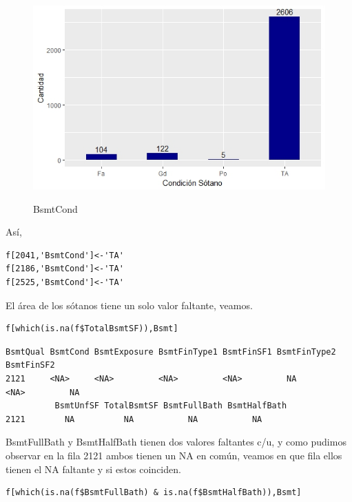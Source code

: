 \documentclass{report}
\begin{document}
\begin{itemize}
\begin{itemize}
\begin{itemize}
\begin{figure}[h]
	\centering
	\includegraphics[scale=0.8]{Csotano.JPEG}
	\label{p1}
	\caption{BsmtCond}
\end{figure}

Así,

\begin{lstlisting}[frame=single]
f[2041,'BsmtCond']<-'TA'
f[2186,'BsmtCond']<-'TA'
f[2525,'BsmtCond']<-'TA'
\end{lstlisting}

\newpage

El área de los sótanos tiene un solo valor faltante, veamos.\\

\begin{lstlisting}[frame=single]
f[which(is.na(f$TotalBsmtSF)),Bsmt]
\end{lstlisting}

\begin{lstlisting}[frame=single]
       BsmtQual BsmtCond BsmtExposure BsmtFinType1 BsmtFinSF1 BsmtFinType2 BsmtFinSF2
2121     <NA>     <NA>         <NA>         <NA>         NA         <NA>         NA
          BsmtUnfSF TotalBsmtSF BsmtFullBath BsmtHalfBath
2121        NA          NA           NA           NA
\end{lstlisting}
\vspace{2mm}
BsmtFullBath y BsmtHalfBath tienen dos valores faltantes c/u, y como pudimos observar en la fila 2121 ambos tienen un NA en común, veamos en que fila ellos tienen el NA faltante y si estos coinciden.\\

\begin{lstlisting}[frame=single]
f[which(is.na(f$BsmtFullBath) & is.na(f$BsmtHalfBath)),Bsmt]
\end{lstlisting}


\end{itemize}
\end{itemize}
\end{itemize}
\end{document}
